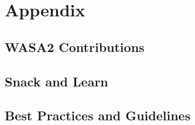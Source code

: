 \chapter{Appendix}

\section{WASA2 Contributions}


\section{Snack and Learn}


\section{Best Practices and Guidelines}






\clearpage


%
%
\makeatletter
\renewenvironment{thebibliography}[1]
     {\section{\bibname}
      \list{\@biblabel{\@arabic\c@enumiv}}
           {\settowidth\labelwidth{\@biblabel{#1}}
            \leftmargin\labelwidth
            \advance\leftmargin\labelsep
            \@openbib@code
            \usecounter{enumiv}%
            \let\p@enumiv\@empty
            \renewcommand\theenumiv{\@arabic\c@enumiv}}
      \sloppy
      \clubpenalty4000
      \@clubpenalty \clubpenalty
      \widowpenalty4000
      \sfcode`\.\@m}
     {\def\@noitemerr
       {\@latex@warning{Empty `thebibliography' environment}}%
      \endlist}
\makeatother

